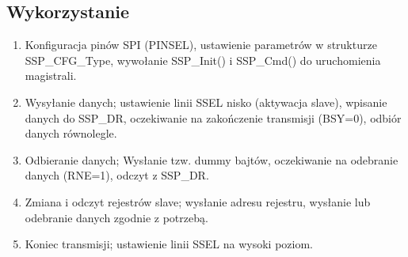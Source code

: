 \subsection{Wykorzystanie}
\begin{enumerate}
    \item Konfiguracja pinów SPI (PINSEL), ustawienie parametrów w strukturze SSP\_CFG\_Type, wywołanie SSP\_Init() i SSP\_Cmd() do uruchomienia magistrali.
    \item Wysyłanie danych; ustawienie linii SSEL nisko (aktywacja slave), wpisanie danych do SSP\_DR, oczekiwanie na zakończenie transmisji (BSY=0), odbiór danych równolegle.
    \item Odbieranie danych; Wysłanie tzw. dummy bajtów, oczekiwanie na odebranie danych (RNE=1), odczyt z SSP\_DR.
    \item Zmiana i odczyt rejestrów slave; wysłanie adresu rejestru, wysłanie lub odebranie danych zgodnie z potrzebą.
    \item Koniec transmisji; ustawienie linii SSEL na wysoki poziom.
\end{enumerate}